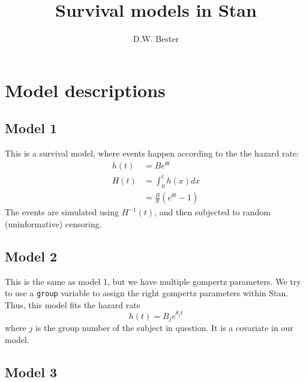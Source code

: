 \documentclass[12pt]{article}
\title{Survival models in Stan}
\author{D.W. Bester}
\date{}
\begin{document}
\maketitle

\section{Model descriptions}

\subsection*{Model 1}\label{subsec:model-1}

This is a survival model, where events happen according to the the
hazard rate:
\begin{align*}
h(t)
&= B e^{\theta t} \\
H(t)
&= \int_0^t{h(x)dx} \\
&= \frac{B}{\theta} \left( e^{\theta t}-1  \right)
\end{align*}
The events are simulated using $H^{-1}(t)$, and then subjected to
random (uninformative) censoring.


\subsection*{Model 2}\label{subsec:model-2}

This is the same as model 1, but we have multiple gompertz parameters.
We try to use a \texttt{group} variable to assign the right gompertz
parameters within Stan.
Thus, this model fits the hazard rate
\begin{equation}
h(t) = B_j e^{\theta_j t}
\end{equation}
where $j$ is the group number of the subject in question. It is a
covariate in our model.

\subsection*{Model 3}\label{subsec:model-3}
\end{document}
